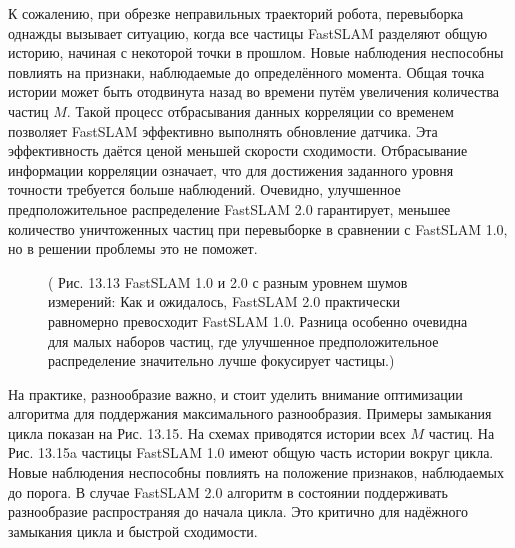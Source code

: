 \documentclass[10pt,a4paper]{article}
\begin{document}
К сожалению, при обрезке неправильных траекторий робота, перевыборка однажды вызывает ситуацию, когда все частицы FastSLAM разделяют общую историю, начиная с некоторой точки в прошлом. Новые наблюдения неспособны повлиять на признаки, наблюдаемые до определённого момента. Общая точка истории может быть отодвинута назад во времени путём увеличения количества частиц $M$. Такой процесс отбрасывания данных корреляции со временем позволяет FastSLAM эффективно выполнять обновление датчика. Эта эффективность даётся ценой меньшей скорости сходимости. Отбрасывание информации корреляции означает, что для достижения заданного уровня точности требуется больше наблюдений. Очевидно, улучшенное предположительное распределение FastSLAM 2.0 гарантирует, меньшее количество уничтоженных частиц  при перевыборке в сравнении с FastSLAM 1.0, но  в решении проблемы это не поможет.

\begin{figure}[H]
	\caption{ ( Рис. 13.13 FastSLAM 1.0 и 2.0 с разным уровнем шумов измерений: Как и ожидалось, FastSLAM 2.0 практически равномерно превосходит FastSLAM 1.0. Разница особенно очевидна для малых наборов частиц, где улучшенное предположительное распределение значительно лучше фокусирует частицы.) }
	\label{fig:1313orig}
\end{figure}

На практике, разнообразие важно, и стоит уделить внимание оптимизации алгоритма для поддержания максимального разнообразия. Примеры замыкания цикла показан на Рис. 13.15. На схемах приводятся истории всех $M$ частиц. На Рис. 13.15a частицы FastSLAM 1.0 имеют общую часть истории вокруг цикла. Новые наблюдения неспособны повлиять на положение признаков, наблюдаемых до порога. В случае FastSLAM 2.0 алгоритм в состоянии поддерживать разнообразие распространяя до начала цикла. Это критично для надёжного замыкания цикла и быстрой сходимости.
\end{document}
